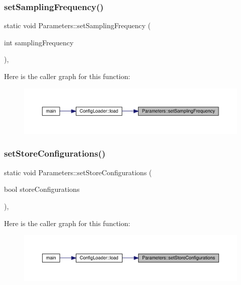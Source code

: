 \subsubsection{\texorpdfstring{setSamplingFrequency()}{setSamplingFrequency()}}
{\footnotesize\ttfamily static void Parameters\+::set\+Sampling\+Frequency (\begin{DoxyParamCaption}\item[{int}]{sampling\+Frequency }\end{DoxyParamCaption})\hspace{0.3cm}{\ttfamily [inline]}, {\ttfamily [static]}}

Here is the caller graph for this function\+:\nopagebreak
\begin{figure}[H]
\begin{center}
\leavevmode
\includegraphics[width=350pt]{class_parameters_ae9fa4bf77247404758c43179849ae3bf_icgraph}
\end{center}
\end{figure}
\mbox{\label{class_parameters_a7ab55c1529015de4c5c182cfa9f004e8}} 
\subsubsection{\texorpdfstring{setStoreConfigurations()}{setStoreConfigurations()}}
{\footnotesize\ttfamily static void Parameters\+::set\+Store\+Configurations (\begin{DoxyParamCaption}\item[{bool}]{store\+Configurations }\end{DoxyParamCaption})\hspace{0.3cm}{\ttfamily [inline]}, {\ttfamily [static]}}

Here is the caller graph for this function\+:\nopagebreak
\begin{figure}[H]
\begin{center}
\leavevmode
\includegraphics[width=350pt]{class_parameters_a7ab55c1529015de4c5c182cfa9f004e8_icgraph}
\end{center}
\end{figure}
\mbox{\label{class_parameters_a84290346277f15c8241c035b7aa452ad}} 
